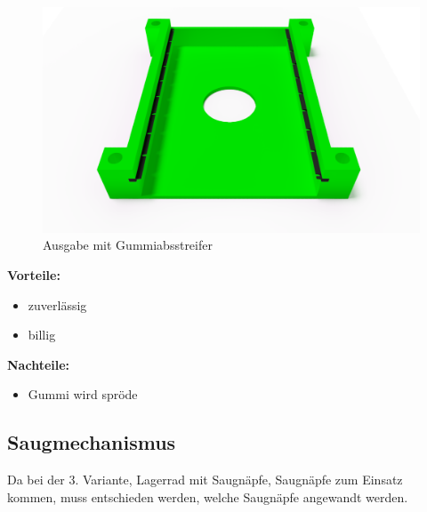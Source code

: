 \begin{enumerate}
    \begin{figure}[H]
        \centering
        \includegraphics[scale=0.4,page=1]{fig/mech/AusgabeMitGummiabstreifer}
        \caption{Ausgabe mit Gummiabsstreifer}
    \end{figure}

    \textbf{Vorteile:}
    \begin{itemize}
        \item zuverlässig
        \item billig
    \end{itemize}
    \textbf{Nachteile:}
    \begin{itemize}
        \item Gummi wird spröde
    \end{itemize}
\end{enumerate}

\subsection{Saugmechanismus}

Da bei der 3. Variante, Lagerrad mit Saugnäpfe, Saugnäpfe zum Einsatz kommen, muss entschieden werden, welche Saugnäpfe angewandt werden.

